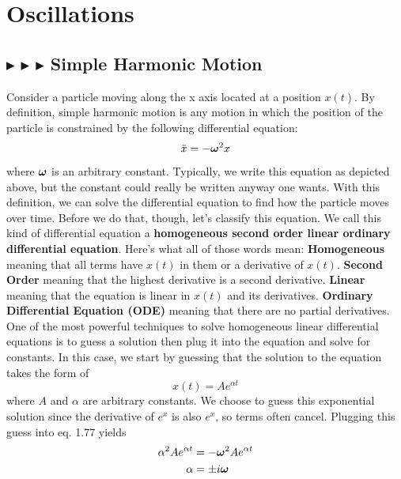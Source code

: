 \section{Oscillations}\label{1.6}

%
%
\subsection{\color{PineGreen} $\blacktriangleright$ \color{Goldenrod} $\blacktriangleright$ \color{Orchid} $\blacktriangleright$ \color{black} Simple Harmonic Motion} \label{1.6.1}
Consider a particle moving along the x axis located at a position $x(t)$. By definition, simple harmonic motion is any motion in which the position of the particle is constrained by the following differential equation:
\begin{equation}
    \ddot{x} = -\boldsymbol{\omega}^2 x
\end{equation}
\noindent where $\boldsymbol{\omega}$ is an arbitrary constant. Typically, we write this equation as depicted above, but the constant could really be written anyway one wants. With this definition, we can solve the differential equation to find how the particle moves over time. Before we do that, though, let's classify this equation. We call this kind of differential equation a \textbf{homogeneous second order linear ordinary differential equation}. Here's what all of those words mean: \textbf{Homogeneous} meaning that all terms have $x(t)$ in them or a derivative of $x(t)$. \textbf{Second Order} meaning that the highest derivative is a second derivative. \textbf{Linear} meaning that the equation is linear in $x(t)$ and its derivatives. \textbf{Ordinary Differential Equation (ODE)} meaning that there are no partial derivatives. One of the most powerful techniques to solve homogeneous linear differential equations is to guess a solution then plug it into the equation and solve for constants. In this case, we start by guessing that the solution to the equation takes the form of 
\begin{equation*}
    x(t) = Ae^{\alpha t}
\end{equation*}
\noindent where $A$ and $\alpha$ are arbitrary constants. We choose to guess this exponential solution since the derivative of $e^x$ is also $e^x$, so terms often cancel. Plugging this guess into eq. 1.77 yields 
\begin{align*}
    \alpha^2Ae^{\alpha t} &= -\boldsymbol{\omega}^2 Ae^{\alpha t} \\
    \alpha &= \pm i\boldsymbol{\omega}
\end{align*}
